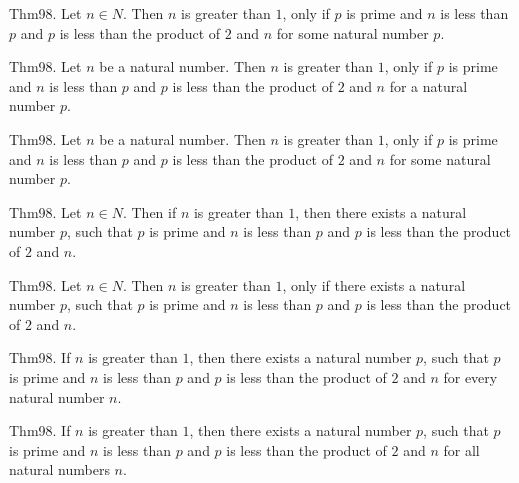 \documentclass{article}
\begin{document}
Thm98. Let $n \in N$. Then $n$ is greater than $1$, only if $p$ is prime and $n$ is less than $p$ and $p$ is less than the product of $2$ and $n$ for some natural number $p$.

Thm98. Let $n$ be a natural number. Then $n$ is greater than $1$, only if $p$ is prime and $n$ is less than $p$ and $p$ is less than the product of $2$ and $n$ for a natural number $p$.

Thm98. Let $n$ be a natural number. Then $n$ is greater than $1$, only if $p$ is prime and $n$ is less than $p$ and $p$ is less than the product of $2$ and $n$ for some natural number $p$.

Thm98. Let $n \in N$. Then if $n$ is greater than $1$, then there exists a natural number $p$, such that $p$ is prime and $n$ is less than $p$ and $p$ is less than the product of $2$ and $n$.

Thm98. Let $n \in N$. Then $n$ is greater than $1$, only if there exists a natural number $p$, such that $p$ is prime and $n$ is less than $p$ and $p$ is less than the product of $2$ and $n$.

Thm98. If $n$ is greater than $1$, then there exists a natural number $p$, such that $p$ is prime and $n$ is less than $p$ and $p$ is less than the product of $2$ and $n$ for every natural number $n$.

Thm98. If $n$ is greater than $1$, then there exists a natural number $p$, such that $p$ is prime and $n$ is less than $p$ and $p$ is less than the product of $2$ and $n$ for all natural numbers $n$.
\end{document}
